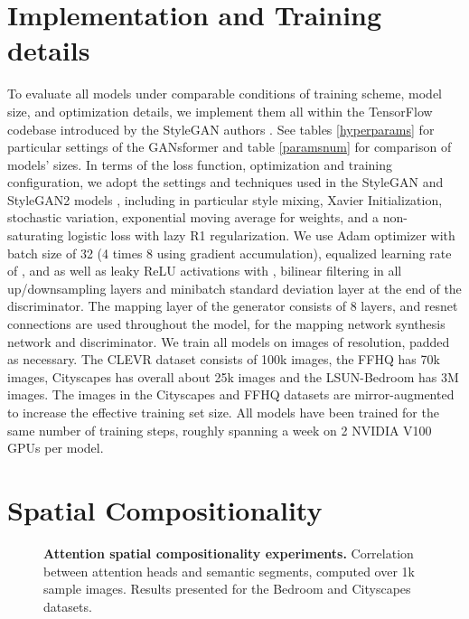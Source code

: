 \documentclass{article}
\begin{document}
\section{Implementation and Training details}
\label{impl}
To evaluate all models under comparable conditions of training scheme, model size, and optimization details, we implement them all within the TensorFlow codebase introduced by the StyleGAN authors \citep{stylegan}. See tables \ref{hyperparams} for particular settings of the GANsformer and table \ref{paramsnum} for comparison of models' sizes. In terms of the loss function, optimization and training configuration, we adopt the settings and techniques used in the StyleGAN and StyleGAN2 models \citep{stylegan,stylegan2}, including in particular style mixing, Xavier Initialization, stochastic variation, exponential moving average for weights, and a non-saturating logistic loss with lazy R1 regularization. We use Adam optimizer with batch size of 32 (4 times 8 using gradient accumulation), equalized learning rate of ,  and  as well as leaky ReLU activations with , bilinear filtering in all up/downsampling layers and minibatch standard deviation layer at the end of
the discriminator. The mapping layer of the generator consists of 8 layers, and resnet connections are used throughout the model, for the mapping network synthesis network and discriminator. We train all models on images of  resolution, padded as necessary. The CLEVR dataset consists of 100k images, the FFHQ has 70k images, Cityscapes has overall about 25k images and the LSUN-Bedroom has 3M images. The images in the Cityscapes and FFHQ datasets are mirror-augmented to increase the effective training set size. All models have been trained for the same number of training steps, roughly spanning a week on 2 NVIDIA V100 GPUs per model. 

\section{Spatial Compositionality}

\begin{figure}[ht]

\centering
{}
\hfill
{}

\hfill
{}
\vspace*{-2mm}
\caption{\textbf{Attention spatial compositionality experiments.} Correlation between attention heads and semantic segments, computed over 1k sample images. Results presented for the Bedroom and Cityscapes datasets.}
\label{corr}
\end{figure}
\end{document}
